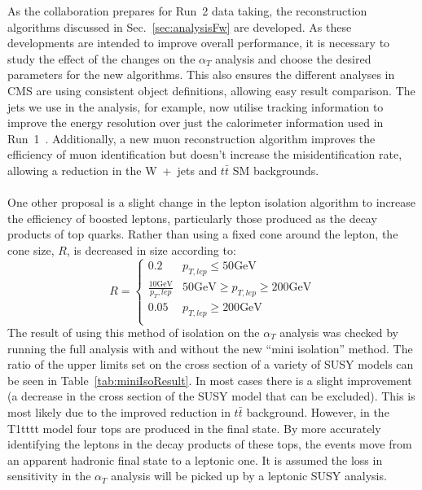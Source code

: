 \noindent As the collaboration prepares for Run~2 data taking, the reconstruction algorithms discussed in Sec.~\ref{sec:analysisFw} are developed. As these developments are intended to improve overall performance, it is necessary to study the effect of the changes on the $\alpha_T$ analysis and choose the desired parameters for the new algorithms. This also ensures the different analyses in CMS are using consistent object definitions, allowing easy result comparison. The jets we use in the analysis, for example, now utilise tracking information to improve the energy resolution over just the calorimeter information used in Run~1~\cite{CMSPFlow1}. Additionally, a new muon reconstruction algorithm improves the efficiency of muon identification but doesn't increase the misidentification rate, allowing a reduction in the W~+~jets and $t\bar{t}$ SM backgrounds. 
\\\\
One other proposal is a slight change in the lepton isolation algorithm to increase the efficiency of boosted leptons, particularly those produced as the decay products of top quarks. Rather than using a fixed cone around the lepton, the cone size, $R$, is decreased in size according to:
\begin{equation}
R =
  \begin{cases}
    0.2       & p_{T,lep} \leq 50\textrm{GeV}\\
    \frac{10\textrm{GeV}}{p_T,lep}       & 50\textrm{GeV}\geq p_{T,lep} \geq 200\textrm{GeV}\\
    0.05     &  p_{T,lep} \geq 200\textrm{GeV}\\
  \end{cases}
\end{equation}
The result of using this method of isolation on the $\alpha_T$ analysis was checked by running the full analysis with and without the new ``mini isolation'' method. The ratio of the upper limits set on the cross section of a variety of SUSY models can be seen in Table~\ref{tab:miniIsoResult}. In most cases there is a slight improvement (a decrease in the cross section of the SUSY model that can be excluded). This is most likely due to the improved reduction in $t\bar{t}$ background. However, in the T1tttt model four tops are produced in the final state. By more accurately identifying the leptons in the decay products of these tops, the events move from an apparent hadronic final state to a leptonic one. It is assumed the loss in sensitivity in the $\alpha_T$ analysis will be picked up by a leptonic SUSY analysis.
